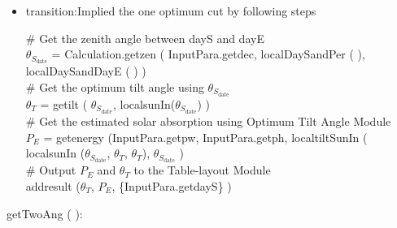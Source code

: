 \documentclass[12pt, titlepage]{article}
\begin{document}
\begin{itemize}
\item transition:Implied the one optimum cut by following steps


$\#$ Get the zenith angle between dayS and
dayE\\
$\theta_{S_{\text{date}}}$ = Calculation.getzen ( InputPara.getdec,   localDaySandPer ( ),  localDaySandDayE ( ) )\\

$\#$ Get the optimum tilt angle using $\theta_{S_{\text{date}}}$\\
$\theta_{T}$ = getilt ( $\theta_{S_{\text{date}}}$, localsunIn($\theta_{S_{\text{date}}}$) )\\


$\#$ Get the estimated solar absorption using Optimum Tilt Angle Module\\

$P_{E}$ = getenergy (InputPara.getpw, InputPara.getph, localtiltSunIn ( localsunIn ($\theta_{S_{\text{date}}}$, $\theta_{T}$, $\theta_{T}$), $\theta_{S_{\text{date}}}$ )\\

$\#$ Output $P_{E}$ and $\theta_{T}$ to the Table-layout Module\\
addresult ($\theta_{T}$, $P_{E}$, \{InputPara.getdayS\} )\\



\end{itemize}

\noindent  getTwoAng ( ):
\end{document}
